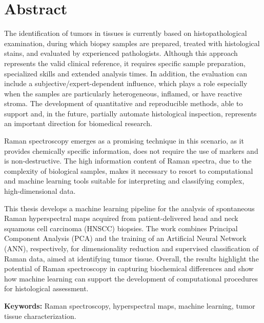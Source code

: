 \chapter*{Abstract}

The identification of tumors in tissues is currently based on histopathological examination, during which biopsy samples are prepared, treated with histological stains, and evaluated by experienced pathologists. Although this approach represents the valid clinical reference, it requires specific sample preparation, specialized skills and extended analysis times. In addition, the evaluation can include a subjective/expert-dependent influence, which plays a role especially when the samples are particularly heterogeneous, inflamed, or have reactive stroma. The development of quantitative and reproducible methods, able to support and, in the future, partially automate histological inspection, represents an important direction for biomedical research. 

Raman spectroscopy emerges as a promising technique in this scenario, as it provides chemically specific information, does not require the use of markers and is non-destructive. The high information content of Raman spectra, due to the complexity of biological samples, makes it necessary to resort to computational and machine learning tools suitable for interpreting and classifying complex, high-dimensional data. 

This thesis develops a machine learning pipeline for the analysis of spontaneous Raman hyperspectral maps acquired from patient-delivered head and neck squamous cell carcinoma (HNSCC) biopsies. The work combines Principal Component Analysis (PCA) and the training of an Artificial Neural Network (ANN), respectively, for dimensionality reduction and supervised classification of Raman data, aimed at identifying tumor tissue. Overall, the results highlight the potential of Raman spectroscopy in capturing biochemical differences and show how machine learning can support the development of computational procedures for histological assessment.

\vspace{1em}
\noindent\textbf{Keywords:} Raman spectroscopy, hyperspectral maps, machine learning, tumor tissue characterization.
